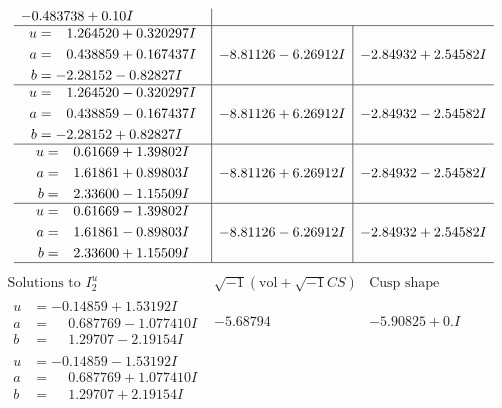 \documentclass[1p]{elsarticle_modified}
\theoremstyle{definition}
\newcommand{\I}{\sqrt{-1}}
\begin{document}
$$\begin{array}{c|c|c}
-0.483738 + 0. 10   I\phantom{ +0.000000I} \\ \hline\begin{aligned}
u &= \phantom{-}1.264520 + 0.320297 I \\
a &= \phantom{-}0.438859 + 0.167437 I \\
b &= -2.28152 - 0.82827 I\end{aligned}
 & -8.81126 - 6.26912 I & -2.84932 + 2.54582 I \\ \hline\begin{aligned}
u &= \phantom{-}1.264520 - 0.320297 I \\
a &= \phantom{-}0.438859 - 0.167437 I \\
b &= -2.28152 + 0.82827 I\end{aligned}
 & -8.81126 + 6.26912 I & -2.84932 - 2.54582 I \\ \hline\begin{aligned}
u &= \phantom{-}0.61669 + 1.39802 I \\
a &= \phantom{-}1.61861 + 0.89803 I \\
b &= \phantom{-}2.33600 - 1.15509 I\end{aligned}
 & -8.81126 + 6.26912 I & -2.84932 - 2.54582 I \\ \hline\begin{aligned}
u &= \phantom{-}0.61669 - 1.39802 I \\
a &= \phantom{-}1.61861 - 0.89803 I \\
b &= \phantom{-}2.33600 + 1.15509 I\end{aligned}
 & -8.81126 - 6.26912 I & -2.84932 + 2.54582 I\\
 \hline 
 \end{array}$$\newpage$$\begin{array}{c|c|c}  
\text{Solutions to }I^u_{2}& \I (\text{vol} + \sqrt{-1}CS) & \text{Cusp shape}\\
 \hline 
\begin{aligned}
u &= -0.14859 + 1.53192 I \\
a &= \phantom{-}0.687769 - 1.077410 I \\
b &= \phantom{-}1.29707 - 2.19154 I\end{aligned}
 & -5.68794\phantom{ +0.000000I} & -5.90825 + 0. I\phantom{ +0.000000I} \\ \hline\begin{aligned}
u &= -0.14859 - 1.53192 I \\
a &= \phantom{-}0.687769 + 1.077410 I \\
b &= \phantom{-}1.29707 + 2.19154 I\end{aligned}

\end{array}$$
\end{document}
